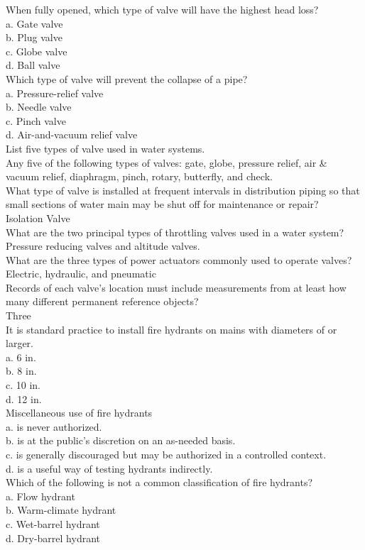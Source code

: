 When fully opened, which type of valve will have the highest head loss?\\
a.	Gate valve\\
b.	Plug valve\\
c.	Globe valve\\
d.	Ball valve\\
Which type of valve will prevent the collapse of a pipe?\\
a.	Pressure-relief valve\\
b.	Needle valve\\
c.	Pinch valve\\
d.	Air-and-vacuum relief valve\\
List five types of valve used in water systems.\\
Any five of the following types of valves: gate, globe, pressure relief, air \& vacuum relief, diaphragm, pinch, rotary, butterfly, and check.\\
What type of valve is installed at frequent intervals in distribution piping so that small sections of water main may be shut off for maintenance or repair?\\
Isolation Valve\\
What are the two principal types of throttling valves used in a water system?\\
Pressure reducing valves and altitude valves.\\
What are the three types of power actuators commonly used to operate valves?\\
Electric, hydraulic, and pneumatic\\
Records of each valve's location must include measurements from at least how many different permanent reference objects?\\
Three\\
It is standard practice to install fire hydrants on mains with diameters of or larger.\\
a.	6 in.\\
b.	8 in.\\
c.	10 in. \\
d.	12 in.\\
Miscellaneous use of fire hydrants\\
a.	is never authorized.\\
b.	is at the public's discretion on an as-needed basis.\\
c.	is generally discouraged but may be authorized in a controlled context.\\
d.	is a useful way of testing hydrants indirectly.\\
Which of the following is not a common classification of fire hydrants?\\
a.	Flow hydrant\\
b.	Warm-climate hydrant\\
c.	Wet-barrel hydrant\\
d.	Dry-barrel hydrant\\

